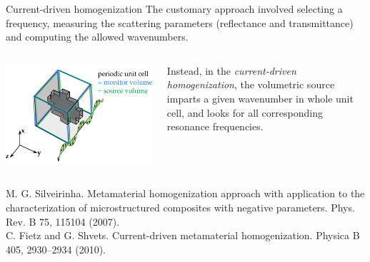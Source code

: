 \documentclass[t]{beamer} \usepackage[english]{babel} \usepackage[utf8]{inputenc} \usetheme{Frankfurt} %
\begin{document}
\begin{frame}{Current-driven homogenization}%
The customary approach involved selecting a frequency, measuring the scattering parameters (reflectance and transmittance) and computing the allowed wavenumbers.
 \vspace{.2em}

\begin{columns}[T] %
	\begin{column}{.5\textwidth}
		\hfill\includegraphics[width=.9\textwidth]{../img/cdh_geometry.pdf}
	\end{column}
	\begin{column}{.5\textwidth}
	\vspace{3mm}
	\noindent Instead, in the \textit{current-driven homogenization}, the volumetric source imparts a given wavenumber in whole unit cell, and looks for all corresponding resonance frequencies.
\end{column}%
\end{columns}
 \vspace{.2em}


\vfill 
\begin{footnotesize}
M. G. Silveirinha. Metamaterial homogenization approach with application to the characterization of microstructured composites with negative parameters. Phys. Rev. B 75, 115104 (2007). \\
C. Fietz and G. Shvets. Current-driven metamaterial homogenization. Physica B 405, 2930–2934 (2010).
\end{footnotesize}
\end{frame} 		%
\end{document}
